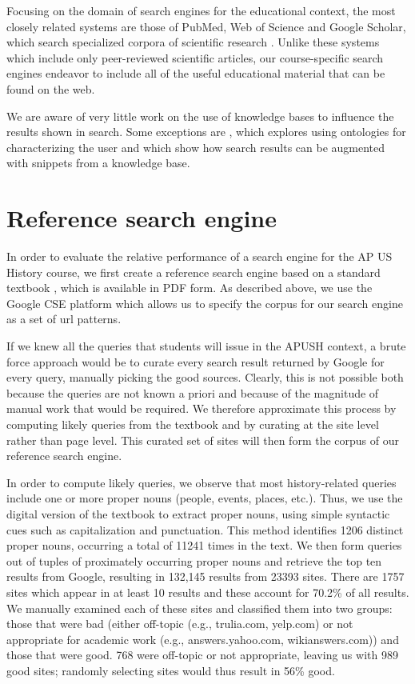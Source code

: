 \documentclass[pdfpagelabels=false,plainpages=true]{acm_proc_article-sp}
\begin{document}
Focusing on the domain of search engines for the educational context, the most
closely related systems are those of PubMed, Web of Science and Google
Scholar, which search specialized corpora of scientific research
\cite{jacso2005google}. Unlike these systems which include only
peer-reviewed scientific articles, our course-specific search engines
endeavor to include all of the useful educational material that can be found on
the web. 

We are aware of very little work on the use of knowledge bases to influence the
results shown in search. Some exceptions are \cite{jiang2009learning}, which explores
using ontologies for characterizing the user and \cite{guha2003semantic} which
show how search results can be augmented with snippets from a knowledge base.   

\section{Reference search engine}

In order to evaluate the relative performance of a search engine for the AP US
History course, we first create a reference search engine based on a standard textbook
\cite{textbook}, which is available in PDF form. As described above,
we use the Google CSE platform which allows us to specify the corpus for our
search engine as a set of url patterns.

If we knew all the queries that students will issue in the APUSH context, a
brute force approach would be to curate every search result returned by
Google for every query, manually picking the good sources. Clearly, this is not possible both
because the queries are not known a priori and because of the magnitude of manual
work that would be required. We therefore approximate this process by computing likely
queries from the textbook and by curating at the site level rather than page
level. This curated set of sites will then form the corpus of our reference
search engine. 

In order to compute likely queries, we observe that most history-related queries
include one or more proper nouns (people, events, 
places, etc.). Thus, we use the digital version of the textbook \cite{textbook}
to extract proper nouns, using simple syntactic cues such as
capitalization and punctuation. This method identifies 1206 distinct proper
nouns, occurring a total of 11241 times in the text. We then form queries out of
tuples of proximately occurring proper nouns and retrieve the top ten results
from Google, resulting in 132,145 results from 23393 sites. There are
1757 sites which appear in at least 10 results and these account for 70.2\% of
all results. We manually examined each of these sites and classified them into two
groups: those that were bad (either off-topic (e.g., trulia.com, yelp.com)
or not appropriate for academic work (e.g., answers.yahoo.com, wikianswers.com))
and those that were good. 768 were off-topic or not appropriate, leaving us with
989 good sites; randomly selecting sites would thus result in 56\% good.
\end{document}
